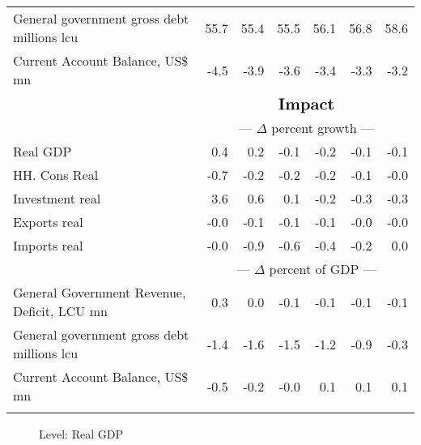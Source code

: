 \documentclass{article}
\begin{document}
\begin{table}[ht]
\begin{tabular}{lrrrrr|r}
General government gross debt millions lcu & 55.7 & 55.4 & 55.5 & 56.1 & 56.8 & 58.6 \\
Current Account Balance, US\$ mn & -4.5 & -3.9 & -3.6 & -3.4 & -3.3 & -3.2 \\
&\multicolumn{6}{c}{{ }}                                                             \\
&\multicolumn{6}{c}{{$\Large \textbf{Impact}$}}                                                             \\
&\multicolumn{6}{c}{{--- $\Delta$  percent growth ---}}                                                             \\
Real GDP & 0.4 & 0.2 & -0.1 & -0.2 & -0.1 & -0.1 \\
HH. Cons Real & -0.7 & -0.2 & -0.2 & -0.2 & -0.1 & -0.0 \\
Investment real & 3.6 & 0.6 & 0.1 & -0.2 & -0.3 & -0.3 \\
Exports real & -0.0 & -0.1 & -0.1 & -0.1 & -0.0 & -0.0 \\
Imports real & -0.0 & -0.9 & -0.6 & -0.4 & -0.2 & 0.0 \\
&\multicolumn{6}{c}{{--- $\Delta$  percent of GDP ---}}                                                             \\
General Government Revenue, Deficit, LCU mn & 0.3 & 0.0 & -0.1 & -0.1 & -0.1 & -0.1 \\
General government gross debt millions lcu & -1.4 & -1.6 & -1.5 & -1.2 & -0.9 & -0.3 \\
Current Account Balance, US\$ mn & -0.5 & -0.2 & -0.0 & 0.1 & 0.1 & 0.1 \\
&\multicolumn{6}{c}{{ }}                                                             \\
\bottomrule
\end{tabular}
\end{table}
 
\begin{figure}[htbp]
\centering
\resizebox{\textwidth}{!}{}
\caption{Level: Real GDP}
\end{figure}
\end{document}
